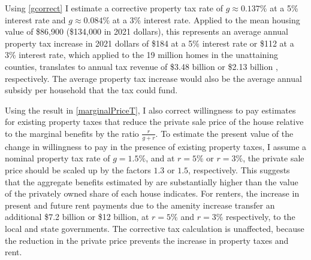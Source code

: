 \documentclass[ecta,nameyear,draft]{econsocart}
\theoremstyle{plain}
\theoremstyle{remark}
\begin{document}
Using \ref{gcorrect} I estimate a corrective property tax rate of $g\approx 0.137\%$ at a 5\% interest rate and $g\approx 0.084\%$ at a 3\% interest rate. Applied to the mean housing value of \$86,900 (\$134,000 in 2021 dollars), this represents an average annual property tax increase in 2021 dollars of \$184 at a 5\% interest rate or \$112 at a 3\% interest rate, which applied to the 19 million homes in the unattaining counties, translates to annual tax revenue of \$3.48 billion %
or \$2.13 billion 
, respectively. The average property tax increase would also be the average annual subsidy per household that the tax could fund. 

Using the result in \ref{marginalPriceT}, I also correct willingness to pay estimates for existing property taxes that reduce the private sale price of the house relative to the marginal benefits by the ratio $\frac{r}{g+r}$. To estimate the present value of the change in willingness to pay in the presence of existing property taxes, I assume a nominal property tax rate of $g=1.5\%$, and at $r=5\%$ or $r=3\%$, the private sale price should be scaled up by the factors $1.3$ or $1.5$, respectively. This suggests that the aggregate benefits estimated by \cite{chaygreenstone05} are substantially higher than the value of the privately owned share of each house indicates. For renters, the increase in present and future rent payments due to the amenity increase transfer an additional \$7.2 billion or \$12 billion, at $r=5\%$ and $r=3\%$ respectively, to the local and state governments. The corrective tax calculation is unaffected, because the reduction in the private price prevents the increase in property taxes and rent.

\end{document}
